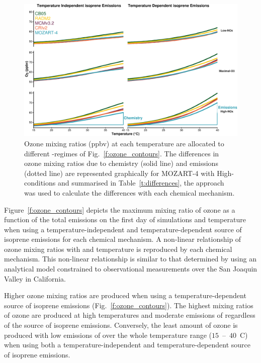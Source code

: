 \begin{figure}[t]%
    \centering%
    \caption{Ozone mixing ratios (ppbv) at each temperature are allocated to different -regimes of Fig.~\ref{f:ozone_contours}. The differences in ozone mixing ratios due to chemistry (solid line) and emissions (dotted line) are represented graphically for MOZART-4 with High- conditions and summarised in Table~\ref{t:differences}, the approach was used to calculate the differences with each chemical mechanism.}%
    \label{f:O3-T}%
    \includegraphics[width=\textwidth]{img/O3-T_correlation}%
\end{figure}

\begin{table}%
    \centering%
    \caption{Increase in ozone mixing ratio (ppbv) due to chemistry and emissions at $40$~\degree C from reference temperature ($20$~\degree C) in the -regimes of Fig.~\ref{f:O3-T}.}%
    \label{t:differences}%
\end{table}

Figure~\ref{f:ozone_contours} depicts the maximum mixing ratio of ozone as a function of the total  emissions on the first day of simulations and temperature when using a temperature-independent and temperature-dependent source of isoprene emissions for each chemical mechanism.
A non-linear relationship of ozone mixing ratios with  and temperature is reproduced by each chemical mechanism.
This non-linear relationship is similar to that determined by \citet{Pusede:2014} using an analytical model constrained to observational measurements over the San Joaquin Valley in California.

Higher ozone mixing ratios are produced when using a temperature-dependent source of isoprene emissions (Fig.~\ref{f:ozone_contours}).
The highest mixing ratios of ozone are produced at high temperatures and moderate emissions of  regardless of the source of isoprene emissions.
Conversely, the least amount of ozone is produced with low emissions of  over the whole temperature range ($15$~--~$40$~\degree C) when using both a temperature-independent and temperature-dependent source of isoprene emissions.

